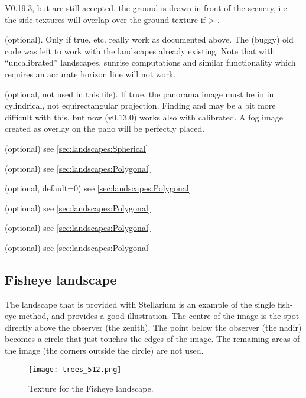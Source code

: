 \begin{description}
{    V0.19.3, but  are still accepted.} the ground is drawn in
  front of the scenery, i.e. the side textures will overlap over the
  ground texture if  >
  .
\item[\var{calibrated}] (optional). Only if true,
   etc. really work as documented above. The
  (buggy) old code was left to work with the landscapes already
  existing. Note that with ``uncalibrated'' landscapes, sunrise
  computations and similar functionality which requires an accurate
  horizon line will not work.
\item[\var{tan\_mode}] (optional, not used in this file). If true, the
  panorama image must be in in cylindrical, not equirectangular
  projection. Finding  and
   may be a bit more difficult with this, but
  now (v0.13.0) works also with calibrated. A fog image created as
  overlay on the pano will be perfectly placed.
\item[\var{polygonal\_horizon\_list}] (optional) see \ref{sec:landscapes:Spherical}
\item[\var{polygonal\_horizon\_list\_mode}] (optional) see \ref{sec:landscapes:Polygonal}
\item[\var{polygonal\_angle\_rotatez}] (optional, default=0) see \ref{sec:landscapes:Polygonal}
\item[\var{horizon\_line\_color}] (optional) see \ref{sec:landscapes:Polygonal}
\item[\var{minimal\_brightness}]  (optional) see \ref{sec:landscapes:Polygonal}
\item[\var{minimal\_altitude}] (optional) see \ref{sec:landscapes:Polygonal}
\end{description}


\subsection{Fisheye landscape}
\label{sec:landscapes:Fisheye}

The  landscape that is provided with Stellarium is an
example of the single fish-eye method, and provides a good
illustration. The centre of the image is the spot directly above the
observer (the zenith). The point below the observer (the nadir)
becomes a circle that just touches the edges of the image. The
remaining areas of the image (the corners outside the circle) are not
used.

\begin{figure}[t]
\centering\texttt{[image: trees\_512.png]}
\caption{Texture for the  Fisheye landscape.}
\label{fig:landscapes:Fisheye}
\end{figure}



